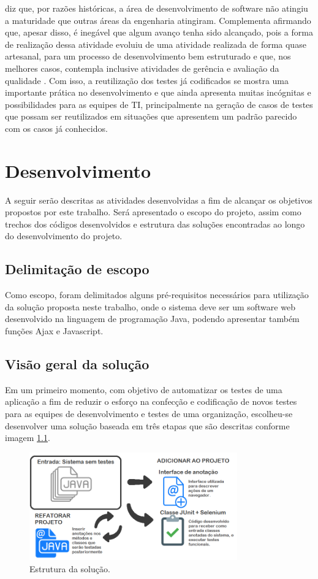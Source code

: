 \documentclass[tg]{mdtufsm}
\begin{document}
\citeauthor{guizzardi2000desenvolvimento} diz que, por razões históricas, a área de desenvolvimento de software não atingiu a maturidade que outras áreas da engenharia atingiram. Complementa afirmando que, apesar disso, é inegável que algum avanço tenha sido alcançado, pois a forma de realização dessa atividade evoluiu de uma atividade realizada de forma quase artesanal, para um processo de
desenvolvimento bem estruturado e que, nos melhores casos, contempla inclusive atividades de gerência e avaliação da qualidade \cite{guizzardi2000desenvolvimento}.
Com isso, a reutilização dos testes já codificados se mostra uma importante prática no desenvolvimento e que ainda apresenta muitas incógnitas e possibilidades para as equipes de TI,
principalmente na geração de casos de testes que possam ser reutilizados em situações que apresentem um padrão parecido com os casos já conhecidos.

\chapter{Desenvolvimento}

A seguir serão descritas as atividades desenvolvidas a fim de alcançar os objetivos propostos por este trabalho. Será apresentado o escopo do projeto, assim como trechos dos códigos desenvolvidos e estrutura das soluções encontradas ao longo do desenvolvimento do projeto.

\section{Delimitação de escopo}

Como escopo, foram delimitados alguns pré-requisitos necessários para utilização da solução proposta neste trabalho, onde o sistema deve ser um software web desenvolvido na linguagem de programação Java,
podendo apresentar também funções Ajax e Javascript.

\section{Visão geral da solução}
Em um primeiro momento, com objetivo de automatizar os testes de uma aplicação a fim de reduzir o esforço na confecção e codificação de novos testes para as equipes de desenvolvimento e testes de uma organização,
escolheu-se desenvolver uma solução baseada em três etapas que são descritas conforme imagem \ref{fig:solucao1}.

\begin{figure}[!htb]
	\centering
	\includegraphics[width=0.8\textwidth]{solucao1}
	\caption{Estrutura da solução.}
	\label{fig:solucao1}
\end{figure}
\end{document}
